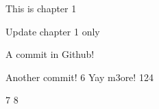 This is chapter 1

Update chapter 1 only

A commit in Github!

Another commit!
6
Yay m3ore!
124

7
8
